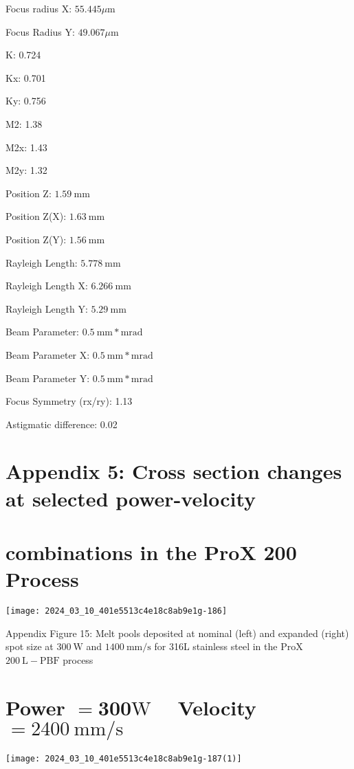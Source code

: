 \documentclass[10pt]{article}
\begin{document}
Focus radius X: $55.445 \mu \mathrm{m}$

Focus Radius Y: $49.067 \mu \mathrm{m}$

K: 0.724

Kx: 0.701

Ky: 0.756

M2: 1.38

M2x: 1.43

M2y: 1.32

Position Z: $1.59 \mathrm{~mm}$

Position Z(X): $1.63 \mathrm{~mm}$

Position Z(Y): $1.56 \mathrm{~mm}$

Rayleigh Length: $5.778 \mathrm{~mm}$

Rayleigh Length X: $6.266 \mathrm{~mm}$

Rayleigh Length Y: $5.29 \mathrm{~mm}$

Beam Parameter: $0.5 \mathrm{~mm} * \mathrm{mrad}$

Beam Parameter X: $0.5 \mathrm{~mm} * \mathrm{mrad}$

Beam Parameter Y: $0.5 \mathrm{~mm} * \mathrm{mrad}$

Focus Symmetry (rx/ry): 1.13

Astigmatic difference: 0.02

\section*{Appendix 5: Cross section changes at selected power-velocity}
\section*{combinations in the ProX 200 Process}
\begin{center}
\texttt{[image: 2024\_03\_10\_401e5513c4e18c8ab9e1g-186]}
\end{center}

Appendix Figure 15: Melt pools deposited at nominal (left) and expanded (right) spot size at $300 \mathrm{~W}$ and $1400 \mathrm{~mm} / \mathrm{s}$ for 316L stainless steel in the ProX $200 \mathrm{~L}-\mathrm{PBF}$ process

\section*{Power $=\mathbf{3 0 0} \mathrm{W} \quad$ Velocity $=2400 \mathrm{~mm} / \mathrm{s}$}
\begin{center}
\texttt{[image: 2024\_03\_10\_401e5513c4e18c8ab9e1g-187(1)]}
\end{center}
\end{document}
